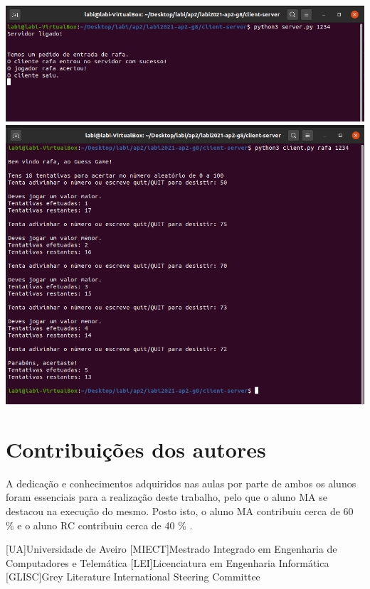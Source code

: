 \documentclass{report}
\begin{document}
\begin{center}
    \includegraphics[scale = 0.52]{Imagens/servidor.png}
    \includegraphics[scale = 0.52]{Imagens/cliente.png}
\end{center}

\chapter*{Contribuições dos autores}
A dedicação e conhecimentos adquiridos nas aulas por parte de ambos os alunos foram essenciais para a realização deste trabalho, pelo que o aluno MA se destacou na execução do mesmo. Posto isto, o aluno MA contribuiu cerca de 60 \% e o aluno RC contribuiu cerca de 40 \% .




\begin{acronym}
[UA]{Universidade de Aveiro}
[MIECT]{Mestrado Integrado em Engenharia de Computadores e Telemática}
[LEI]{Licenciatura em Engenharia Informática}
[GLISC]{Grey Literature International Steering Committee}
\end{acronym}


\printbibliography
\end{document}
